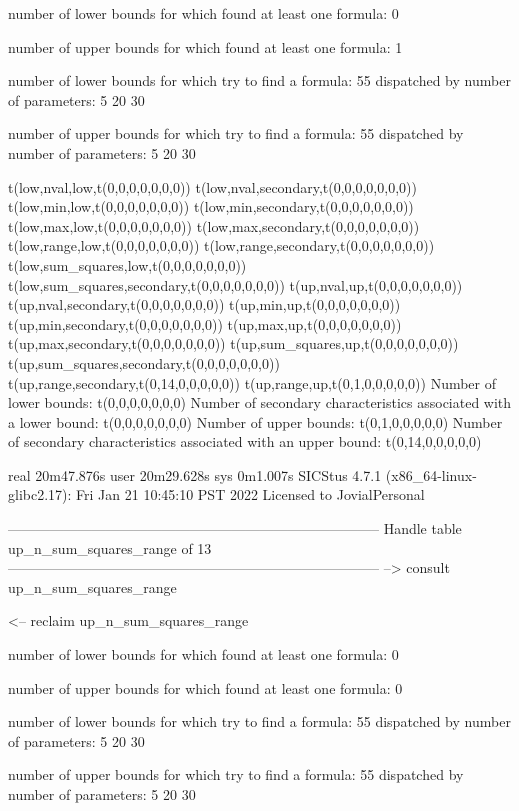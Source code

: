 number of lower bounds for which found at least one formula: 0

number of upper bounds for which found at least one formula: 1

number of lower bounds for which try to find a formula: 55
dispatched by number of parameters: 5  20  30

number of upper bounds for which try to find a formula: 55
dispatched by number of parameters: 5  20  30

t(low,nval,low,t(0,0,0,0,0,0,0))
t(low,nval,secondary,t(0,0,0,0,0,0,0))
t(low,min,low,t(0,0,0,0,0,0,0))
t(low,min,secondary,t(0,0,0,0,0,0,0))
t(low,max,low,t(0,0,0,0,0,0,0))
t(low,max,secondary,t(0,0,0,0,0,0,0))
t(low,range,low,t(0,0,0,0,0,0,0))
t(low,range,secondary,t(0,0,0,0,0,0,0))
t(low,sum_squares,low,t(0,0,0,0,0,0,0))
t(low,sum_squares,secondary,t(0,0,0,0,0,0,0))
t(up,nval,up,t(0,0,0,0,0,0,0))
t(up,nval,secondary,t(0,0,0,0,0,0,0))
t(up,min,up,t(0,0,0,0,0,0,0))
t(up,min,secondary,t(0,0,0,0,0,0,0))
t(up,max,up,t(0,0,0,0,0,0,0))
t(up,max,secondary,t(0,0,0,0,0,0,0))
t(up,sum_squares,up,t(0,0,0,0,0,0,0))
t(up,sum_squares,secondary,t(0,0,0,0,0,0,0))
t(up,range,secondary,t(0,14,0,0,0,0,0))
t(up,range,up,t(0,1,0,0,0,0,0))
Number of lower bounds:                                             t(0,0,0,0,0,0,0)
Number of secondary characteristics associated with a lower bound:  t(0,0,0,0,0,0,0)
Number of upper bounds:                                             t(0,1,0,0,0,0,0)
Number of secondary characteristics associated with an upper bound: t(0,14,0,0,0,0,0)

real	20m47.876s
user	20m29.628s
sys	0m1.007s
SICStus 4.7.1 (x86_64-linux-glibc2.17): Fri Jan 21 10:45:10 PST 2022
Licensed to JovialPersonal


--------------------------------------------------------------------------------
Handle table up_n_sum_squares_range of 13
--------------------------------------------------------------------------------
--> consult up_n_sum_squares_range

<-- reclaim up_n_sum_squares_range

number of lower bounds for which found at least one formula: 0

number of upper bounds for which found at least one formula: 0

number of lower bounds for which try to find a formula: 55
dispatched by number of parameters: 5  20  30

number of upper bounds for which try to find a formula: 55
dispatched by number of parameters: 5  20  30

